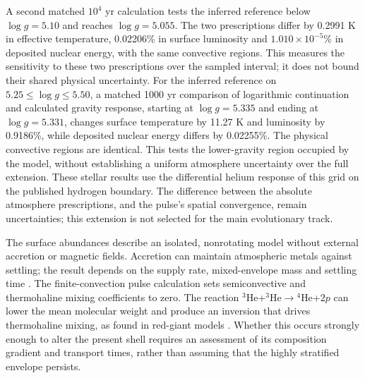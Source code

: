 \documentclass[11pt,letterpaper]{article}
\begin{document}
A second matched $10^4$ yr calculation tests the inferred reference below
$\log g=5.10$ and reaches $\log g=5.055$. The two prescriptions differ by
0.2991 K in effective temperature, 0.02206\% in surface luminosity and
$1.010\times10^{-5}\%$ in deposited nuclear energy, with the same convective
regions. This measures the sensitivity to these two prescriptions over the
sampled interval; it does not bound their shared physical uncertainty.
For the inferred reference on $5.25\leq\log g\leq5.50$, a matched
1000 yr comparison of logarithmic continuation and calculated gravity response,
starting at $\log g=5.335$ and ending at $\log g=5.331$, changes surface
temperature by 11.27 K and luminosity by 0.9186\%, while deposited nuclear
energy differs by 0.02255\%. The physical convective regions are identical.
This tests the lower-gravity region occupied by the model, without establishing
a uniform atmosphere uncertainty over the full extension.
These stellar results use the differential helium response of this grid on
the published hydrogen boundary. The difference between the absolute
atmosphere prescriptions, and the pulse's spatial convergence, remain
uncertainties; this extension is not selected for the main evolutionary track.

The surface abundances describe an isolated, nonrotating model without
external accretion or magnetic fields. Accretion can maintain atmospheric
metals against settling; the result depends on the supply rate, mixed-envelope
mass and settling time \cite{bauer19}. The finite-convection pulse calculation
sets semiconvective and thermohaline mixing coefficients to zero. The reaction
$^3$He+$^3$He$\rightarrow{}^4$He+$2p$ can lower the mean molecular weight and
produce an inversion that drives thermohaline mixing, as found in red-giant
models \cite{charbonnel07}. Whether this occurs strongly enough to alter the
present shell requires an assessment of its composition gradient and transport
times, rather than assuming that the highly stratified envelope persists.
\end{document}
